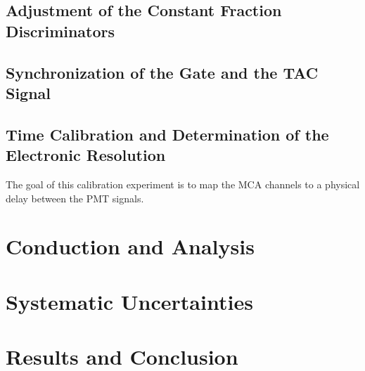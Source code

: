 \documentclass[
	paper=A4,
	parskip=full,
	chapterprefix=true,
	11pt,
	headings=normal,
	bibliography=totoc,
	listof=totoc,
	titlepage=on,
]{scrreprt}
\begin{document}
\section{Adjustment of the Constant Fraction Discriminators}
\section{Synchronization of the Gate and the TAC Signal}

\section{Time Calibration and Determination of the Electronic Resolution}
The goal of this calibration experiment is to map the MCA channels to a physical delay between the PMT signals. 

\chapter{Conduction and Analysis}

\chapter{Systematic Uncertainties}

\chapter{Results and Conclusion}


\cleardoublepage


{}
\end{document}
